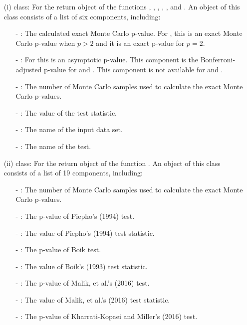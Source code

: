 \begin{itemize}
	\item[(i)]  class: For the return object of the functions , , , , , and .  An object of this class consists of a list of six components, including:
	\begin{itemize}
		\item[-] : The calculated exact Monte Carlo p-value. For , this is an exact Monte Carlo p-value when $p>2$ and it is an exact p-value for $p=2$. 
		\item[-] : For  this is an asymptotic p-value. This component is the Bonferroni-adjusted p-value for  and . This component is not available for  and . 
		\item[-] : The number of Monte Carlo samples used to calculate the exact Monte Carlo p-values.
		\item[-] : The value of the test statistic.
		\item[-] : The name of the input data set.
		\item[-] : The name of the test.
	\end{itemize}
	\item[(ii)]  class: For the return object of the function . An object of this class consists of a list of 19 components, including:
	\begin{itemize}
		\item[-]  : The number of Monte Carlo samples used to calculate the exact Monte Carlo p-values.
		\item[-] : The p-value of Piepho's (1994) test.
		\item[-] : The value of Piepho's (1994) test statistic.
		\item[-] : The p-value of Boik test.
		\item[-] : The value of Boik's (1993) test statistic.
		\item[-] : The p-value of Malik, et al.'s (2016)  test.
		\item[-] : The value of Malik, et al.'s (2016)  test statistic.
		\item[-] : The p-value of Kharrati-Kopaei and Miller's (2016) test.

\end{itemize}
\end{itemize}
